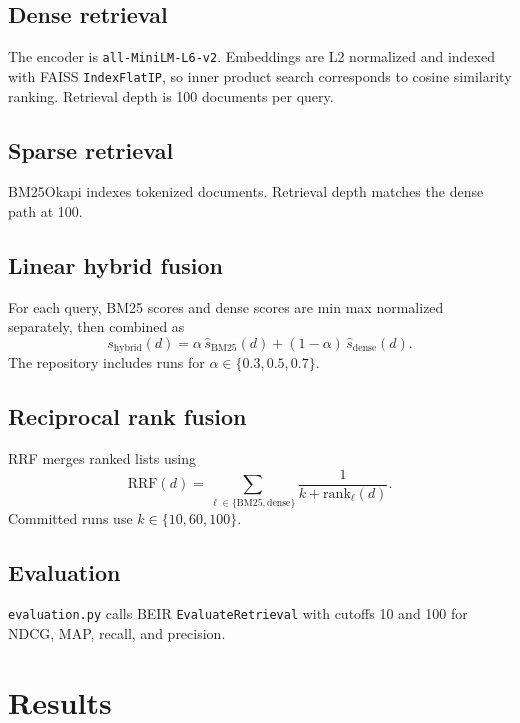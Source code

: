 \documentclass[11pt,a4paper]{article}
\begin{document}
\subsection{Dense retrieval}

The encoder is \texttt{all-MiniLM-L6-v2}. Embeddings are L2 normalized and indexed with FAISS \texttt{IndexFlatIP}, so inner product search corresponds to cosine similarity ranking. Retrieval depth is 100 documents per query.

\subsection{Sparse retrieval}

BM25Okapi indexes tokenized documents. Retrieval depth matches the dense path at 100.

\subsection{Linear hybrid fusion}

For each query, BM25 scores and dense scores are min max normalized separately, then combined as
\begin{equation}
s_{\mathrm{hybrid}}(d) = \alpha\, \hat{s}_{\mathrm{BM25}}(d) + (1-\alpha)\, \hat{s}_{\mathrm{dense}}(d).
\end{equation}
The repository includes runs for $\alpha \in \{0.3, 0.5, 0.7\}$.

\subsection{Reciprocal rank fusion}

RRF merges ranked lists using
\begin{equation}
\mathrm{RRF}(d) = \sum_{\ell \in \{\mathrm{BM25},\mathrm{dense}\}} \frac{1}{k + \mathrm{rank}_\ell(d)}.
\end{equation}
Committed runs use $k \in \{10, 60, 100\}$.

\subsection{Evaluation}

\texttt{evaluation.py} calls BEIR \texttt{EvaluateRetrieval} with cutoffs 10 and 100 for NDCG, MAP, recall, and precision.

\section{Results}
\end{document}
